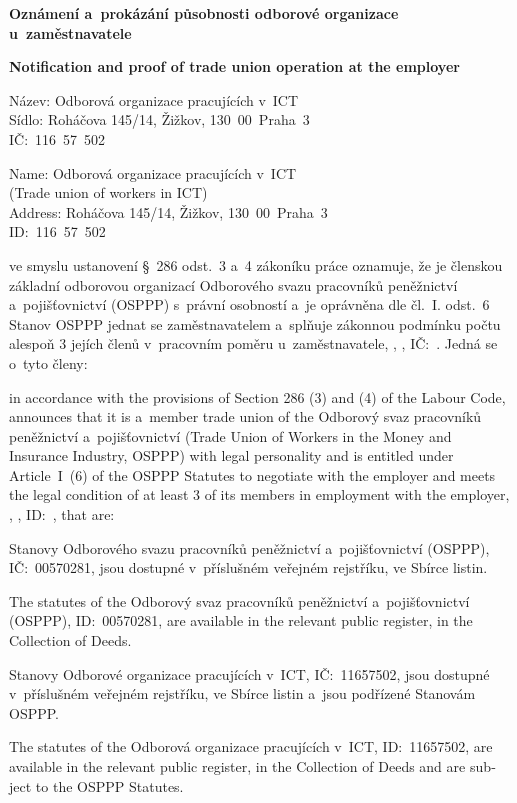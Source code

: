 \documentclass[11pt]{article}
\newcommand{\pair}[3][\raggedright]{%
  \begin{minipage}[t]{0.47\textwidth}
    #1 #2
  \end{minipage}%
  \hfill
  \begin{minipage}[t]{0.47\textwidth}
    #1\foreignlanguage{english}{#3}
  \end{minipage}%
  \par\vspace{6mm}
}
\newcommand{\Employer}{\CompanyName, \CompanyAddress, IČ:~\CompanyId}
\newcommand{\EmployerEn}{\CompanyName, \CompanyAddress, ID:~\CompanyId}
\begin{document}
  \pair[\centering]{
    \textbf{Oznámení a~prokázání působnosti odborové organizace u~zaměstnavatele}
  }{
    \textbf{Notification and proof of trade union operation at the employer}
  }

  \pair{
    Název: Odborová organizace pracujících v~ICT\\
    Sídlo: Roháčova 145/14, Žižkov, \mbox{130~00 Praha~3}\\
    IČ:~116~57~502
  }{
    Name: Odborová organizace pracujících v~ICT\\
    (Trade union of workers in ICT)\\
    Address: Roháčova 145/14, Žižkov, \mbox{130~00 Praha~3}\\
    ID:~116~57~502
  }

  \pair{
    ve smyslu ustanovení §~286 odst.~3 a~4 zákoníku práce oznamuje, že je
    členskou základní odborovou organizací Odborového svazu pracovníků
    peněžnictví a~pojišťovnictví (OSPPP) s~právní osobností a~je oprávněna dle
    čl.~I. odst.~6 Stanov OSPPP jednat se zaměstnavatelem a~splňuje zákonnou
    podmínku počtu alespoň 3 jejích členů v~pracovním poměru u~zaměstnavatele,
    \Employer. Jedná se o~tyto členy:\\[\baselineskip]
    \RepresentativeNames
  }{
    in accordance with the provisions of Section 286 (3) and (4) of the Labour
    Code, announces that it is a~member trade union of the Odborový svaz
    pracovníků peněžnictví a~pojišťovnictví (Trade Union of Workers in the
    Money and Insurance Industry, OSPPP) with legal personality and is entitled
    under Article~I~(6) of the OSPPP Statutes to negotiate with the employer and
    meets the legal condition of at least 3 of its members in employment with
    the employer, \EmployerEn, that are:\\[\baselineskip]
    \RepresentativeNames
  }

  \pair{
    Stanovy Odborového svazu pracovníků peněžnictví a~pojišťovnictví (OSPPP),
    IČ:~00570281, jsou dostupné v~příslušném veřejném rejstříku, ve Sbírce
    listin.
  }{
    The statutes of the Odborový svaz pracovníků peněžnictví a~pojišťovnictví
    (OSPPP), ID:~00570281, are available in the relevant public register, in
    the Collection of Deeds.
  }

  \pair{
    Stanovy Odborové organizace pracujících v~ICT, IČ:~11657502, jsou dostupné
    v~příslušném veřejném rejstříku, ve Sbírce listin a~jsou podřízené Stanovám
    OSPPP.
  }{
    The statutes of the Odborová organizace pracujících v~ICT, ID:~11657502,
    are available in the relevant public register, in the Collection of Deeds
    and are subject to the OSPPP Statutes.
  }
\end{document}
